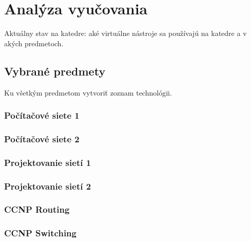 \chapter{Analýza vyučovania}

Aktuálny stav na katedre: aké virtuálne nástroje sa používajú na katedre a v akých predmetoch.

\section{Vybrané predmety}

Ku všetkým predmetom vytvoriť zoznam technológii.

\subsection{Počítačové siete 1}

\subsection{Počítačové siete 2}

\subsection{Projektovanie sietí 1}

\subsection{Projektovanie sietí 2}

\subsection{CCNP Routing}

\subsection{CCNP Switching}